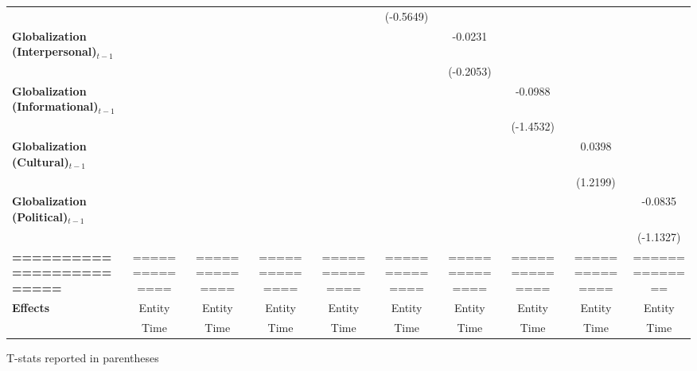 \begin{center}
\begin{tabular}{lccccccccc}
\textbf{ }                         &                &                  &                  &                  &    (-0.5649)     &                  &                  &                  &                   \\
\textbf{Globalization (Interpersonal)$_{t-1}$}             &                &                  &                  &                  &                  &     -0.0231      &                  &                  &                   \\
\textbf{ }                         &                &                  &                  &                  &                  &    (-0.2053)     &                  &                  &                   \\
\textbf{Globalization (Informational)$_{t-1}$}             &                &                  &                  &                  &                  &                  &     -0.0988      &                  &                   \\
\textbf{ }                         &                &                  &                  &                  &                  &                  &    (-1.4532)     &                  &                   \\
\textbf{Globalization (Cultural)$_{t-1}$}             &                &                  &                  &                  &                  &                  &                  &      0.0398      &                   \\
\textbf{ }                         &                &                  &                  &                  &                  &                  &                  &     (1.2199)     &                   \\
\textbf{Globalization (Political)$_{t-1}$}             &                &                  &                  &                  &                  &                  &                  &                  &     -0.0835       \\
\textbf{ }                         &                &                  &                  &                  &                  &                  &                  &                  &    (-1.1327)      \\
\textbf{=========================} & ============== &  ==============  &  ==============  &  ==============  &  ==============  &  ==============  &  ==============  &  ==============  &  ==============   \\
\textbf{Effects}                   &     Entity     &      Entity      &      Entity      &      Entity      &      Entity      &      Entity      &      Entity      &      Entity      &      Entity       \\
\textbf{}                          &      Time      &       Time       &       Time       &       Time       &       Time       &       Time       &       Time       &       Time       &       Time        \\
\bottomrule
\end{tabular}
\end{center}

T-stats reported in parentheses